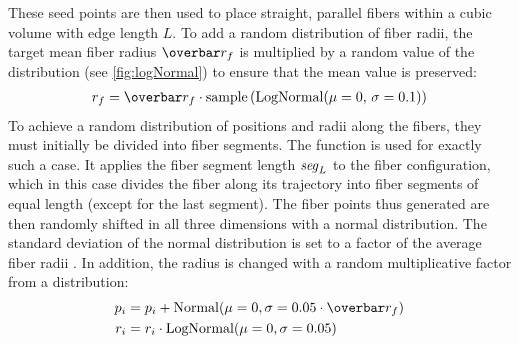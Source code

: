 %
These seed points are then used to place straight, parallel fibers within a cubic volume with edge length $L$.
To add a random distribution of fiber radii, the target mean fiber radius $\fiberRadiusMean$ is multiplied by a random value of the  distribution (see \cref{fig:logNormal}) to ensure that the mean value is preserved:
\begin{align}
\fiberRadius = \fiberRadiusMean \cdot \mathrm{sample}\left(\mathrm{LogNormal}(\mu=0, \, \sigma=0.1)\right)
\end{align}
%
To achieve a random distribution of positions and radii along the fibers, they must initially be divided into fiber segments.
The function  is used for exactly such a case.
It applies the fiber segment length $\textnormal{$\mathit{seg}_{L}$}$ to the fiber configuration, which in this case divides the fiber along its trajectory into fiber segments of equal length (except for the last segment).
The fiber points thus generated are then randomly shifted in all three dimensions with a normal distribution.
The standard deviation of the normal distribution is set to a factor of the average fiber radii \fiberRadiusMean{}.
In addition, the radius is changed with a random multiplicative factor from a  distribution:
%
\begin{align}
\begin{split}
p_i &= p_i + \mathrm{Normal}(\mu=0,\sigma=0.05 \cdot \fiberRadiusMean)\\
r_i &= r_i \cdot \mathrm{LogNormal}(\mu=0,\sigma=0.05)
\end{split}
\end{align}
%
%
%
